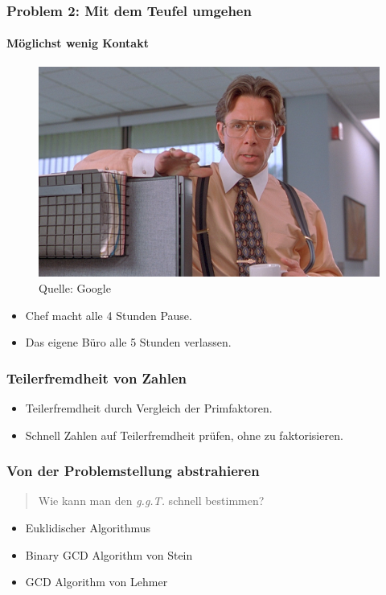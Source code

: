 \documentclass[•]{beamer}
\begin{document}
\begin{frame}
	\frametitle{Problem 2: Mit dem Teufel umgehen}
    \framesubtitle{M\"oglichst wenig Kontakt}
    \vspace*{10pt}
     \begin{figure}
	\centering
	\includegraphics[scale=0.17]{cicada}
	\caption*{\scriptsize{Quelle: Google}}
	\end{figure}
    \begin{itemize}
    \item Chef macht alle 4 Stunden Pause.
    \item Das eigene B\"uro alle 5 Stunden verlassen.
    \end{itemize}
\end{frame}

\begin{frame}
	\frametitle{Teilerfremdheit von Zahlen}
\begin{itemize}
\item Teilerfremdheit durch Vergleich der Primfaktoren.
\item Schnell Zahlen auf Teilerfremdheit pr\"ufen, ohne zu faktorisieren.
\end{itemize}
\end{frame}

\begin{frame}
\frametitle{Von der Problemstellung abstrahieren}
\begin{quote}
		Wie kann man den \textit{g.g.T.} schnell bestimmen?
	\end{quote}
	\begin{itemize}
	\item Euklidischer Algorithmus
	\item Binary GCD Algorithm von Stein
	\item GCD Algorithm von Lehmer
	\end{itemize}
\end{frame}
\end{document}
